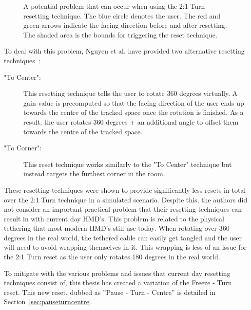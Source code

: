 \begin{figure}[htbp]
  \centering
  
  \caption[Potential Problem With 2:1 Turn Resetting]{A potential problem that can occur when using the 2:1 Turn resetting technique. The blue circle denotes the user. The red and green arrows indicate the facing direction before and after resetting. The shaded area is the bounds for triggering the reset technique.}
  \label{fig:2to1turnProblem}
\end{figure}

To deal with this problem, Nguyen et al. have provided two alternative resetting techniques~\cite{nguyen2018discrete}:

\begin{description}
   \item["To Center": ] This resetting technique tells the user to rotate 360 degrees virtually. A gain value is precomputed so that the facing direction of the user ends up towards the centre of the tracked space once the rotation is finished. As a result, the user rotates 360 degrees + an additional angle to offset them towards the centre of the tracked space.
   \item["To Corner": ] This reset technique works similarly to the "To Center" technique but instead targets the furthest corner in the room. 
\end{description}

These resetting techniques were shown to provide significantly less resets in total over the 2:1 Turn technique in a simulated scenario. Despite this, the authors did not consider an important practical problem that their resetting techniques can result in with current day HMD's. This problem is related to the physical tethering that most modern HMD's still use today. When rotating over 360 degrees in the real world, the tethered cable can easily get tangled and the user will need to avoid wrapping themselves in it. This wrapping is less of an issue for the 2:1 Turn reset as the user only rotates 180 degrees in the real world. 

To mitigate with the various problems and issues that current day resetting techniques consist of, this thesis has created a variation of the Freeze - Turn reset. This new reset, dubbed as ''Pause - Turn - Centre'' is detailed in Section~\ref{sec:pauseturncentre}.

